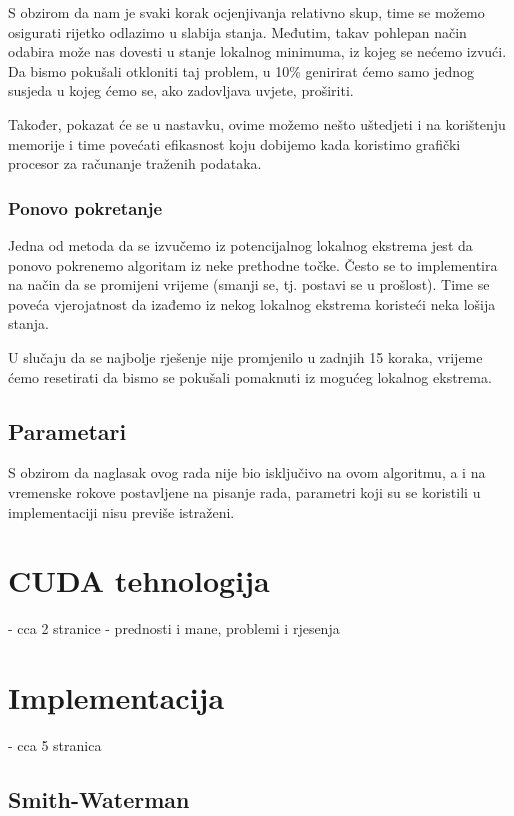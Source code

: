 \documentclass[times, utf8, zavrsni]{fer}
\begin{document}
S obzirom da nam je svaki korak ocjenjivanja relativno skup, time se možemo
osigurati rijetko odlazimo u slabija stanja. Međutim, takav pohlepan
način odabira može nas dovesti u stanje lokalnog minimuma, iz kojeg se nećemo
izvući. Da bismo pokušali otkloniti taj problem, u 10\% genirirat ćemo samo jednog
susjeda u kojeg ćemo se, ako zadovljava uvjete, proširiti. 

Također, pokazat će se u nastavku, ovime možemo nešto uštedjeti i na korištenju
memorije i time povećati efikasnost koju dobijemo kada koristimo grafički
procesor za računanje traženih podataka. 

\subsection{Ponovo pokretanje}

Jedna od metoda da se izvučemo iz potencijalnog lokalnog ekstrema jest da
ponovo pokrenemo algoritam iz neke prethodne točke. Često se to implementira
na način da se promijeni vrijeme (smanji se, tj. postavi se u prošlost).
Time se poveća vjerojatnost da izađemo iz nekog lokalnog ekstrema koristeći
neka lošija stanja. 

U slučaju da se najbolje rješenje nije promjenilo u zadnjih 15 koraka, 
vrijeme ćemo resetirati da bismo se pokušali pomaknuti iz mogućeg lokalnog
ekstrema. 

\section{Parametari}

S obzirom da naglasak ovog rada nije bio isključivo na ovom algoritmu, 
a i na vremenske rokove postavljene na pisanje rada, parametri koji su se
koristili u implementaciji nisu previše istraženi. 


\chapter{CUDA tehnologija}
- cca 2 stranice
- prednosti i mane, problemi i rjesenja

\chapter{Implementacija}
- cca 5 stranica

\section{Smith-Waterman}
\end{document}
